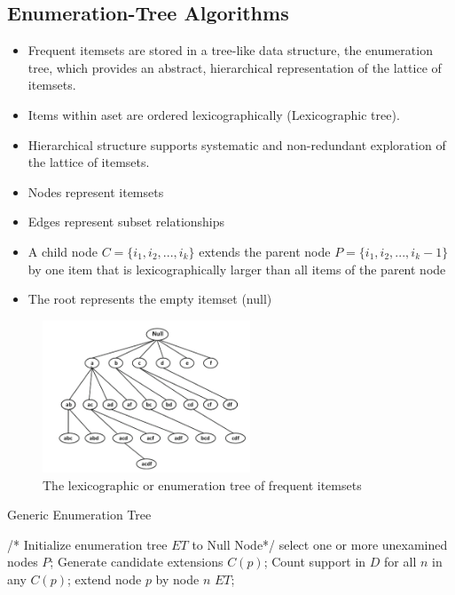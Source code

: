 \documentclass{article}
\begin{document}
\subsection{Enumeration-Tree Algorithms}
\begin{itemize}
  \item Frequent itemsets are stored in a tree-like data structure, the enumeration tree, which provides an abstract, hierarchical representation of the lattice of itemsets.
  \item Items within aset are ordered lexicographically (Lexicographic tree).
  \item Hierarchical structure supports systematic and non-redundant exploration of the lattice of itemsets. \\
  
  \item Nodes represent itemsets
  \item Edges represent subset relationships
  \item A child node $C = \{i_1, i_2, ..., i_k\}$ extends the parent node $P = \{i_1, i_2, ..., i_k-1\}$ by one item that is lexicographically larger than all items of the parent node
  \item The root represents the empty itemset (null)
\end{itemize}

\begin{figure}[h]
\centering
\caption{The lexicographic or enumeration tree of frequent itemsets}
\includegraphics[width=6.2cm]{img/pic4-3.png}
\end{figure}

\begin{algorithm}
\caption{Generic Enumeration Tree}
\begin{algorithmic}[0]
\State /* Initialize enumeration tree $ET$ to Null Node*/
  \State select one or more unexamined nodes $P$;
    \State Generate candidate extensions $C(p)$;
  \EndFor
  \State Count support in $D$ for all $n$ in any $C(p)$;
    \State extend node $p$ by node $n$
  \EndIf
\EndWhile
\Return $ET$;
\EndFunction
\end{algorithmic}
\end{algorithm}
\end{document}
